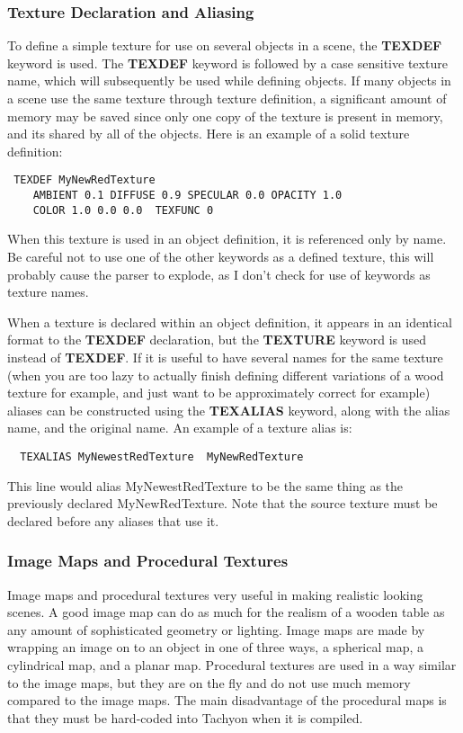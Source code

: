 \subsubsection{Texture Declaration and Aliasing}
  To define a simple texture for use on several objects in a scene, the 
{\bf TEXDEF} keyword is used.  The {\bf TEXDEF} keyword is followed by
a case sensitive texture name, which will subsequently be used while 
defining objects.  If many objects in a scene use the same texture through
texture definition, a significant amount of memory may be saved since only
one copy of the texture is present in memory, and its shared by all
of the objects.  Here is an example of a solid texture definition:
\begin{verbatim}
 TEXDEF MyNewRedTexture   
    AMBIENT 0.1 DIFFUSE 0.9 SPECULAR 0.0 OPACITY 1.0 
    COLOR 1.0 0.0 0.0  TEXFUNC 0
\end{verbatim}
When this texture is used in an object definition, it is referenced only by
name.  Be careful not to use one of the other keywords as a defined texture,
this will probably cause the parser to explode, as I don't check for use
of keywords as texture names. 

  When a texture is declared within an object definition, it appears in 
an identical format to the {\bf TEXDEF} declaration, but the {\bf TEXTURE} 
keyword is used instead of {\bf TEXDEF}.  If it is useful to have several
names for the same texture (when you are too lazy to actually finish defining
different variations of a wood texture for example, and just want to be 
approximately correct for example) aliases can be constructed using the 
{\bf TEXALIAS} keyword, along with the alias name, and the original name.
An example of a texture alias is:
\begin{verbatim}
  TEXALIAS MyNewestRedTexture  MyNewRedTexture
\end{verbatim}
This line would alias MyNewestRedTexture to be the same thing as the 
previously declared MyNewRedTexture.  Note that the source texture must
be declared before any aliases that use it.

\subsubsection{Image Maps and Procedural Textures}
  Image maps and procedural textures very useful in making realistic looking
scenes.  A good image map can do as much for the realism of a wooden table
as any amount of sophisticated geometry or lighting.  Image maps are made by
wrapping an image on to an object in one of three ways, a spherical map, a
cylindrical map, and a planar map.  Procedural textures are used in a way
similar to the image maps, but they are on the fly and do not use much memory
compared to the image maps.  The main disadvantage of the procedural maps
is that they must be hard-coded into Tachyon when it is compiled.

